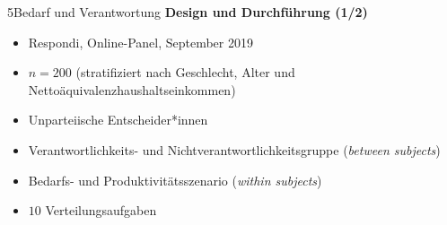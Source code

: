 \documentclass[xcolor=table,9pt,aspectratio=169]{beamer}
\begin{document}
\begin{frame}{\vspace*{10mm}5\hspace*{1em}Bedarf und Verantwortung}
\textbf{Design und Durchführung (1/2)}\\
\medskip
\begin{itemize}
   \item Respondi, Online-Panel, September 2019
   \item $n=200$ (stratifiziert nach Geschlecht, Alter und Nettoäquivalenzhaushaltseinkommen)
   \item Unparteiische Entscheider*innen
   \item Verantwortlichkeits- und Nichtverantwortlichkeitsgruppe (\textit{between subjects})
   \item Bedarfs- und Produktivitätsszenario (\textit{within subjects})
   \item $10$ Verteilungsaufgaben
\end{itemize}
\end{frame}
\end{document}
